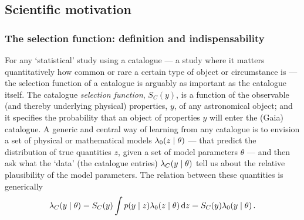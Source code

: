 \subsection{Scientific motivation}
\label{sec:scientific-motivation}

\subsubsection{The selection function: definition and indispensability}

For any `statistical' study using a catalogue --- a study where it matters quantitatively how common or rare a certain type of object or circumstance is --- the selection function of a catalogue is arguably as important as the catalogue itself. The catalogue \textit{selection function}, $S_C(y)$, is a function of the observable (and thereby underlying physical) properties, $y$, of any astronomical object; and it specifies the probability that an object of properties $y$ will enter the (Gaia) catalogue. A generic and central way of learning from any catalogue is to envision a set of physical or mathematical models $\lambda_0(z\mid\theta)$ --- that predict the distribution of true quantities $z$, given a set of model parameters $\theta$ --- and then ask what the `data' (the catalogue entries) $\lambda_C(y\mid\theta)$ tell us about the relative plausibility of the model parameters. The relation between these quantities is generically
\begin{equation}
\lambda_C(y\mid\theta) = S_C(y)\int p(y\mid z)\lambda_0(z\mid\theta)\,{\textrm{d}} z = S_C(y)\lambda_0(y\mid\theta)\,.
\label{eqn:selfunc_definition}
\end{equation}
